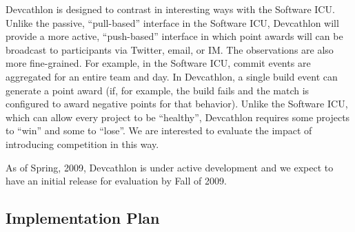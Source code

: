 Devcathlon is designed to contrast in interesting ways with the Software
ICU.  Unlike the passive, ``pull-based'' interface in the Software ICU,
Devcathlon will provide a more active, ``push-based'' interface in which
point awards will can be broadcast to participants via Twitter, email, or
IM.  The observations are also more fine-grained. For example, in the
Software ICU, commit events are aggregated for an entire team and day.  In
Devcathlon, a single build event can generate a point award (if, for
example, the build fails and the match is configured to award negative
points for that behavior).  Unlike the Software ICU, which can allow every
project to be ``healthy'', Devcathlon requires some projects to ``win'' and
some to ``lose''.  We are interested to evaluate the impact of introducing
competition in this way.

As of Spring, 2009, Devcathlon is under active development and we expect to
have an initial release for evaluation by Fall of 2009.


\subsection{Implementation Plan}
\label{sec:implementation}






